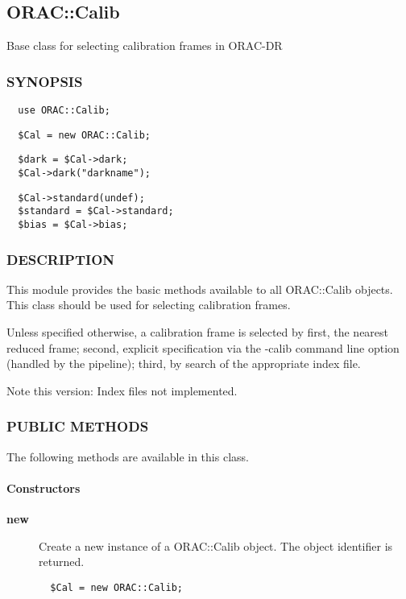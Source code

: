 \subsection{ORAC::Calib\label{ORAC::Calib}}


Base class for selecting calibration frames in ORAC-DR

\subsubsection*{SYNOPSIS\label{ORAC::Calib_SYNOPSIS}}
\begin{verbatim}
  use ORAC::Calib;
\end{verbatim}
\begin{verbatim}
  $Cal = new ORAC::Calib;
\end{verbatim}
\begin{verbatim}
  $dark = $Cal->dark;
  $Cal->dark("darkname");
\end{verbatim}
\begin{verbatim}
  $Cal->standard(undef);
  $standard = $Cal->standard;
  $bias = $Cal->bias;
\end{verbatim}
\subsubsection*{DESCRIPTION\label{ORAC::Calib_DESCRIPTION}}


This module provides the basic methods available to all ORAC::Calib
objects.  This class should be used for selecting calibration frames.



Unless specified otherwise, a calibration frame is selected by first,
the nearest reduced frame; second, explicit specification via the
-calib command line option (handled by the pipeline); third, by search
of the appropriate index file.



Note this version: Index files not implemented.

\subsubsection*{PUBLIC METHODS\label{ORAC::Calib_PUBLIC_METHODS}}


The following methods are available in this class.

\paragraph*{Constructors\label{ORAC::Calib_Constructors}}
\begin{description}

\item[\textbf{new}] \mbox{}

Create a new instance of a ORAC::Calib object.
The object identifier is returned.

\begin{verbatim}
  $Cal = new ORAC::Calib;
\end{verbatim}
\end{description}
